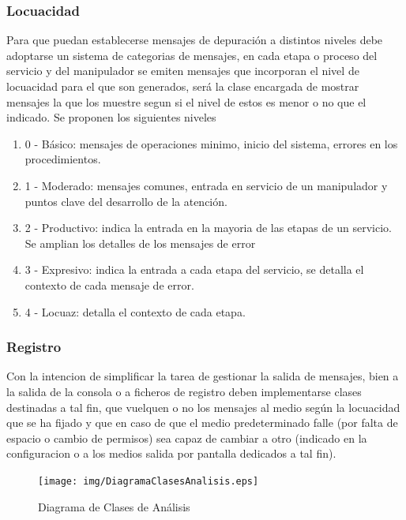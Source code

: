 \documentclass[a4paper,spanish,12pt]{book}
\begin{document}
\subsubsection{Locuacidad}
Para que puedan establecerse mensajes de depuración a distintos niveles debe adoptarse un sistema de categorias de mensajes, en cada etapa o proceso del servicio y del manipulador se emiten mensajes que incorporan el nivel de locuacidad para el que son generados, será la clase encargada de mostrar mensajes la que los muestre segun si el nivel de estos es menor o no que el indicado.
Se proponen los siguientes niveles
\begin{enumerate}
	\item 0 - Básico: mensajes de operaciones minimo, inicio del sistema, errores en los procedimientos.
	\item 1 - Moderado: mensajes comunes, entrada en servicio de un manipulador y puntos clave del desarrollo de la atención.
	\item 2 - Productivo: indica la entrada en la mayoria de las etapas de un servicio. Se amplian los detalles de los mensajes de error
	\item 3 - Expresivo: indica la entrada a cada etapa del servicio, se detalla el contexto de cada mensaje de error.
	\item 4 - Locuaz: detalla el contexto de cada etapa.
\end{enumerate}

\subsubsection{Registro}
Con la intencion de simplificar la tarea de gestionar la salida de mensajes, bien a la salida de la consola o a ficheros de registro deben implementarse clases destinadas a tal fin, que vuelquen o no los mensajes al medio según la locuacidad que se ha fijado y que en caso de que el medio predeterminado falle (por falta de espacio o cambio de permisos) sea capaz de cambiar a otro (indicado en la configuracion o a los medios salida por pantalla dedicados a tal fin).


\begin{figure}[h]
	\texttt{[image: img/DiagramaClasesAnalisis.eps]}
              \caption{Diagrama de Clases de Análisis}
     \label{fig:DiagramaClasesAnalisis}
\end{figure}
\end{document}
